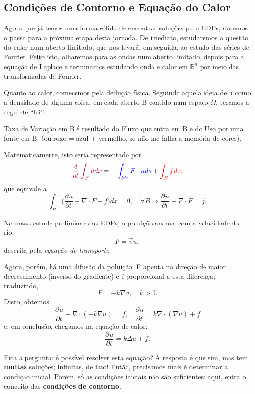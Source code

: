 \documentclass[../pde_notes.tex]{subfiles}
\begin{document}
\subsection{Condições de Contorno e Equação do Calor}
Agora que já temos uma forma sólida de encontrar soluções para EDPs, daremos o passo para a próxima etapa desta jornada. De imediato, estudaremos a questão do calor num aberto limitado, que nos levará, em seguida, ao estudo das séries de Fourier. Feito isto, olharemos para as ondas num aberto limitado, depois para a equação de Laplace e terminamos estudando onda e calor em \(\mathbb{R}^{n}\) por meio das transformadas de Fourier.

Quanto ao calor, comecemos pela dedução física. Seguindo aquela ideia de u como a densidade de alguma coisa, em cada aberto B contido num espaço \(\Omega \), teremos a seguinte ``lei'':
\begin{center}
	\color{purple}Taxa de Variação em B \color{black}é resultado do \color{blue}Fluxo que entra em B \color{black}e do \color{red}Uso por uma fonte em B. \color{black}(ou roxo = azul + vermelho, se não me falha a memória de cores).
\end{center}
Matematicamente, isto seria representado por
\[
	\color{purple}\frac{d}{dt}\int_{B}^{}udx \color{black}=\color{blue}-\int_{\partial V}^{}F \cdot n ds \color{black}+\color{red}\int_{B}^{}f dx,
\]
que equivale a
\[
	\int_{B}^{}\biggl(\frac{\partial^{}u}{\partial t^{}} + \nabla \cdot F - f\biggr)dx = 0,\quad \forall B \Rightarrow \frac{\partial^{}u}{\partial t^{}} + \nabla \cdot F = f.
\]

No nosso estudo preliminar das EDPs, a poluição andava com a velocidade do rio:
\[
	F = \vec{v}u,
\]
descrita pela \hyperlink{transport}{\textit{equação do transporte}}.

Agora, porém, há uma difusão da poluição: F aponta na direção de maior decrescimento (inverso do gradiente) e é proporcional a esta diferença; traduzindo,
\[
	F = - k\nabla u,\quad k>0.
\]
Disto, obtemos
\[
	\frac{\partial^{}u}{\partial t^{}} + \nabla \cdot (-k\nabla u) = f,\quad \frac{\partial^{}u}{\partial t^{}} = k \nabla \cdot (\nabla u)+f
\]
e, em conclusão, chegamos na equação do calor:
\[
	\frac{\partial^{}u}{\partial t^{}} = k \Delta u + f.
\]

Fica a pergunta: é possível resolver esta equação? A resposta é que sim, mas tem \textbf{muitas} soluções; infinitas, de fato! Então, precisamos mais é determinar a condição inicial. Porém, só as condições iniciais não são suficientes: aqui, entra o conceito das \textbf{condições de contorno}.
\end{document}

